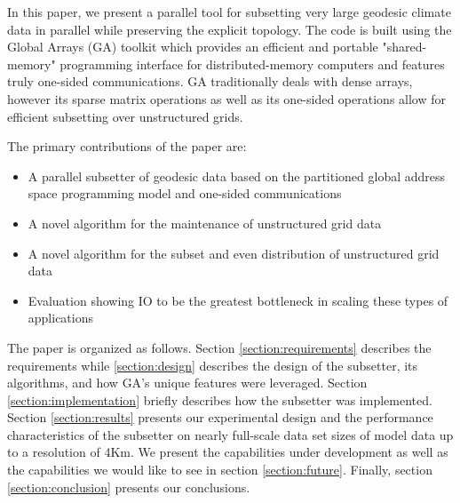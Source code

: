 In this paper, we present a parallel tool for subsetting very large geodesic
climate data in parallel while preserving the explicit topology.  The code is
built using the Global Arrays (GA) toolkit which provides an efficient and
portable "shared-memory" programming interface for distributed-memory
computers and features truly one-sided communications.\cite{GA}  GA
traditionally deals with dense arrays, however its sparse matrix operations as
well as its one-sided operations allow for efficient subsetting over
unstructured grids.

The primary contributions of the paper are:
\begin{itemize}
\item A parallel subsetter of geodesic data based on the partitioned global address space programming model and one-sided communications
\item A novel algorithm for the maintenance of unstructured grid data
\item A novel algorithm for the subset and even distribution of unstructured grid data
\item Evaluation showing IO to be the greatest bottleneck in scaling these types of applications
\end{itemize}

The paper is organized as follows.  Section \ref{section:requirements}
describes the requirements while \ref{section:design} describes the design of
the subsetter, its algorithms, and how GA's unique features were leveraged.
Section \ref{section:implementation} briefly describes how the subsetter was
implemented.  Section \ref{section:results} presents our experimental design
and the performance characteristics of the subsetter on nearly full-scale data
set sizes of model data up to a resolution of 4Km.  We present the
capabilities under development as well as the capabilities we would like to
see in section \ref{section:future}.  Finally, section
\ref{section:conclusion} presents our conclusions.
